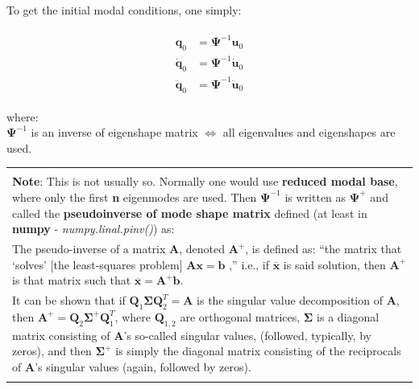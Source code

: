 \documentclass[10pt,b5paper,titlepage]{book}
\newenvironment{bbox}[1][1.0]
{
    \begin{center}
        \begin{tabular}{|p{#1\textwidth}|}
            \hline\\
}
{
            \\\\\hline
        \end{tabular}
    \end{center}
}
\newenvironment{ematrix}
{
    \begin{eqnarray}
        \begin{aligned}
}
{
        \end{aligned}
    \end{eqnarray}
}
\begin{document}
To get the initial modal conditions, one simply:

\begin{ematrix}
    \mathbf{q}_0 &= \mathbf{\Psi}^{-1} \mathbf{u}_0 \\
    \mathbf{\dot{q}}_0 &= \mathbf{\Psi}^{-1} \mathbf{\dot{u}}_0 \\
    \mathbf{\ddot{q}}_0 &= \mathbf{\Psi}^{-1} \mathbf{\ddot{u}}_0
\end{ematrix}

where:\\
$ \mathbf{\Psi}^{-1} $ is an inverse of eigenshape matrix $ \Leftrightarrow $ all eigenvalues
and eigenshapes are used.

\begin{bbox}[0.96]
    \textbf{Note}: This is not usually so. Normally one would use
    \textbf{reduced modal base}, where only the first \textbf{n} eigenmodes are used. Then
    $ \mathbf{\Psi}^{-1} $ is written as $ \mathbf{\Psi}^{+} $ and called the
    \textbf{pseudoinverse of mode shape matrix} defined (at least in \textbf{numpy}
    - \textit{numpy.linal.pinv()}) as:\\

    \smallskip
    The pseudo-inverse of a matrix $ \mathbf{A} $, denoted $ \mathbf{A}^{+} $,
    is defined as: “the matrix that ‘solves’ [the least-squares problem]
    $ \mathbf{A} \mathbf{x} = \mathbf{b} $ ,” i.e., if $ \overline{\mathbf{x}} $
    is said solution, then $ \mathbf{A}^{+} $ is that matrix such that
    $ \overline{\mathbf{x}} = \mathbf{A}^{+} \mathbf{b} $.\\

    \smallskip
    It can be shown that if $ \mathbf{Q}_1 \mathbf{\Sigma} \mathbf{Q}_2^T = \mathbf{A} $
    is the singular value decomposition of $ \mathbf{A} $, then
    $ \mathbf{A}^{+} = \mathbf{Q}_2 \mathbf{\Sigma}^{+} \mathbf{Q}_1^T $, where $ \mathbf{Q}_{1,2} $
    are orthogonal matrices, $ \mathbf{\Sigma} $  is a diagonal matrix consisting of
    $ \mathbf{A} $’s so-called singular values, (followed, typically, by zeros),
    and then $ \mathbf{\Sigma}^{+} $ is simply the diagonal matrix consisting
    of the reciprocals of $ \mathbf{A} $’s singular values (again, followed
    by zeros).
\end{bbox}
\end{document}
